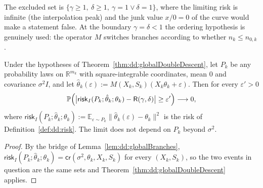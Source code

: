 The excluded set is $\{\gamma\ge1,\ \delta\ge1,\ \gamma=1\vee\delta=1\}$, where the limiting risk is infinite (the interpolation peak) and the junk value $x/0=0$ of the curve would make a statement false. At the boundary $\gamma=\delta<1$ the ordering hypothesis is genuinely used: the operator $M$ switches branches according to whether $n_k\le n_{0,k}$.


\begin{corollary}\label{cor:dd:globalRisk}
  \leanok
Under the hypotheses of Theorem~\ref{thm:dd:globalDoubleDescent}, let $P_k$ be any probability laws on $\mathbb R^{m_k}$ with square-integrable coordinates, mean $0$ and covariance $\sigma^2I$, and let $\hat\theta_k(\varepsilon):=M(X_k,S_k)(X_k\theta_k+\varepsilon)$. Then for every $\varepsilon'>0$
\[
  \mathbb P\Bigl(\bigl|\mathsf{risk}_I(P_k;\hat\theta_k;\theta_k)-\mathsf R(\gamma,\delta)\bigr|\ge\varepsilon'\Bigr)\longrightarrow0,
\]
where $\mathsf{risk}_I(P_k;\hat\theta_k;\theta_k):=\mathbb E_{\varepsilon\sim P_k}\|\hat\theta_k(\varepsilon)-\theta_k\|^2$ is the risk of Definition~\ref{def:dd:risk}. The limit does not depend on $P_k$ beyond $\sigma^2$.
\end{corollary}

\begin{proof}
  \leanok
By the bridge of Lemma~\ref{lem:dd:globalBranches}, $\mathsf{risk}_I(P_k;\hat\theta_k;\theta_k)=\mathsf{cr}(\sigma^2,\theta_k,X_k,S_k)$ for every $(X_k,S_k)$, so the two events in question are the same sets and Theorem~\ref{thm:dd:globalDoubleDescent} applies.
\end{proof}

